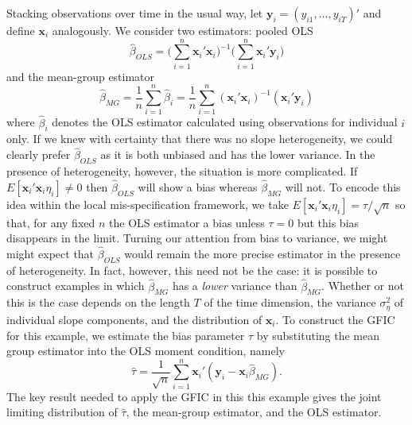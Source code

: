 Stacking observations over time in the usual way, let $\mathbf{y}_i = (y_{i1}, \ldots, y_{iT})'$ and define $\mathbf{x}_i$ analogously. 
We consider two estimators: pooled OLS
	\begin{equation}
\widehat{\beta}_{OLS} = \bigg(\sum_{i=1}^{n} \mathbf{x}_i'  \mathbf{x}_i\bigg)^{-1}\bigg(\sum_{i=1}^{n} \mathbf{x}_i' \mathbf{y}_i   \bigg)	
	\end{equation}
and the mean-group estimator
	\begin{equation}
\widehat{\beta}_{MG}  = \frac{1}{n}\sum_{i=1}^n \widehat{\beta}_i 
= \frac{1}{n} \sum_{i=1}^n \left( \mathbf{x}_i'  \mathbf{x}_i\right)^{-1}\left( \mathbf{x}_i'  \mathbf{y}_i   \right)
\end{equation}
where $\widehat{\beta}_i$ denotes the OLS estimator calculated using observations for individual $i$ only. 
If we knew with certainty that there was no slope heterogeneity, we could clearly prefer $\widehat{\beta}_{OLS}$ as it is both unbiased and has the lower variance.
In the presence of heterogeneity, however, the situation is more complicated.
If $E[\mathbf{x}_i' \mathbf{x}_i \eta_i]\neq 0$ then $\widehat{\beta}_{OLS}$ will show a bias whereas $\widehat{\beta}_{MG}$ will not.
To encode this idea within the local mis-specification framework, we take $E[\mathbf{x}_i'\mathbf{x}_i \eta_i] = \tau/\sqrt{n}$ so that, for any fixed $n$ the OLS estimator a bias unless $\tau = 0$ but this bias disappears in the limit.
Turning our attention from bias to variance, we might might expect that $\widehat{\beta}_{OLS}$ would remain the more precise estimator in the presence of heterogeneity.
In fact, however, this need not be the case: it is possible to construct examples in which $\widehat{\beta}_{MG}$ has a \emph{lower} variance than $\widehat{\beta}_{MG}$.
Whether or not this is the case depends on the length $T$ of the time dimension, the variance $\sigma_{\eta}^2$ of individual slope components, and the distribution of $\mathbf{x}_i$.
To construct the GFIC for this example, we estimate the bias parameter $\tau$ by substituting the mean group estimator into the OLS moment condition, namely
\begin{equation}
\widehat{\tau} = \frac{1}{\sqrt{n}} \sum_{i=1}^n \mathbf{x}_i' (\mathbf{y}_i - \mathbf{x}_i \widehat{\beta}_{MG}).
\end{equation}
The key result needed to apply the GFIC in this this example gives the joint limiting distribution of $\widehat{\tau}$, the mean-group estimator, and the OLS estimator.
